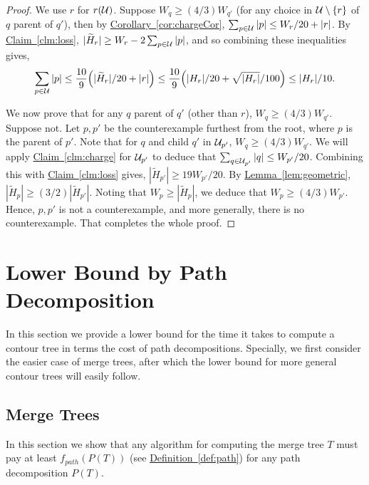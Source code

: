 \documentclass[11pt]{article}
\theoremstyle{definition}
\newcommand{\cU}{{\cal U}}
\newcommand{\Clm}[1]{\hyperref[clm:#1]{Claim~\ref*{clm:#1}}} %
\newcommand{\Lem}[1]{\hyperref[lem:#1]{Lemma~\ref*{lem:#1}}} %
\newcommand{\Cor}[1]{\hyperref[cor:#1]{Corollary~\ref*{cor:#1}}} %
\newcommand{\Def}[1]{\hyperref[def:#1]{Definition~\ref*{def:#1}}} %
\newcommand{\redH}{\widetilde{H}}
\newcommand{\pth}[2][\!]{#1\left({#2}\right)}
\begin{document}
\begin{proof} We use $r$ for $r(\cU)$. %
Suppose $W_q \geq (4/3)W_{q'}$ (for any choice in $\cU\setminus\{r\}$ of $q$ parent of $q'$), 
then by \Cor{chargeCor}, $\sum_{p \in \cU} |p| \leq W_{r}/20+|r|$.
By \Clm{loss}, $|\redH_r| \geq W_r - 2\sum_{p \in \cU} |p|$, and so combining these inequalities gives,
\[
 \sum_{p \in \cU} |p|\leq \frac{10}{9} \pth{|\redH_r|/20+|r|} \leq 
 \frac{10}{9}\pth{|H_r|/20+\sqrt{|H_r|}/100} \leq |H_r|/10.
\]

We now prove that for any $q$ parent of $q'$ (other than $r$), $W_q \geq (4/3)W_{q'}$.
Suppose not. Let $p, p'$ be the counterexample furthest from the root,
where $p$ is the parent of $p'$. 
Note that for $q$ and child $q'$ in $\cU_{p'}$, $W_q \geq (4/3)W_{q'}$.
We will apply \Clm{charge} for $\cU_{p'}$ to deduce that $\sum_{q \in \cU_{p'}} |q| \leq W_{p'}/20$.
Combining this with \Clm{loss} gives, $|\redH_{p'}| \geq 19W_{p'}/20$. By \Lem{geometric}, $|\redH_p| \geq (3/2)|\redH_{p'}|$.
Noting that $W_p \geq |\redH_p|$, we deduce that $W_p \geq (4/3)W_{p'}$.
Hence, $p, p'$ is not a counterexample, and more generally, there is no counterexample.
That completes the whole proof.
\end{proof}







\section{Lower Bound by Path Decomposition}
In this section we provide a lower bound for the time it takes to compute a contour tree in terms the cost of path decompositions.  Specially, 
we first consider the easier case of merge trees, after which the lower bound for more general contour trees will easily follow.

\subsection{Merge Trees}
In this section we show that any algorithm for computing the merge tree $T$ must pay at least $f_{path}(P(T))$ (see \Def{path}) for any path decomposition $P(T)$.

\end{document}
